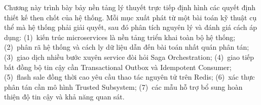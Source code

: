 \documentclass[../DoAn.tex]{subfiles}
\begin{document}
Chương này trình bày bảy nền tảng lý thuyết trực tiếp định hình các quyết định thiết kế
then chốt của hệ thống. Mỗi mục xuất phát từ một bài toán kỹ thuật cụ thể mà hệ thống
phải giải quyết, sau đó phân tích nguyên lý và đánh giá cách áp dụng: (1)~kiến trúc
microservices là nền tảng triển khai toàn bộ hệ thống; (2)~phân rã hệ thống và cách ly
dữ liệu dẫn đến bài toán nhất quán phân tán; (3)~giao dịch nhiều bước xuyên service đòi
hỏi Saga Orchestration; (4)~giao tiếp bất đồng bộ tin cậy cần Transactional Outbox và
Idempotent Consumer; (5)~flash sale đồng thời cao yêu cầu thao tác nguyên tử trên Redis;
(6)~xác thực phân tán cần mô hình Trusted Subsystem; (7)~các mẫu hỗ trợ bổ sung hoàn
thiện độ tin cậy và khả năng quan sát.




\end{document}
